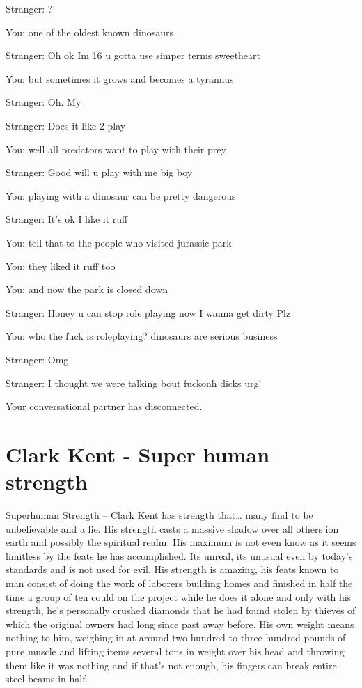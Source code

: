 \documentclass[a1paper]{article}
\begin{document}
\begin{multicols}{7}
{Stranger: ?'

You: one of the oldest known dinosaurs

Stranger: Oh ok Im 16 u gotta use simper terms sweetheart

You: but sometimes it grows and becomes a tyrannus

Stranger: Oh. My

Stranger: Does it like 2 play

You: well all predators want to play with their prey

Stranger: Good will u play with me big boy

You: playing with a dinosaur can be pretty dangerous

Stranger: It's ok I like it ruff

You: tell that to the people who visited jurassic park

You: they liked it ruff too

You: and now the park is closed down

Stranger: Honey u can stop role playing now I wanna get dirty Plz

You: who the fuck is roleplaying? dinosaurs are serious business

Stranger: Omg

Stranger: I thought we were talking bout fuckonh dicks urg!

Your conversational partner has disconnected.
\setlength{\parskip}{0.8em}












\section{Clark Kent - Super human strength}
Superhuman Strength – Clark Kent has strength that… many find to be unbelievable and a lie. His strength casts a massive shadow over all others ion earth and possibly the spiritual realm. His maximum is not even know as it seems limitless by the feats he has accomplished. Its unreal, its unusual even by today’s standards and is not used for evil. His strength is amazing, his feats known to man consist of doing the work of laborers building homes and finished in half the time a group of ten could on the project while he does it alone and only with his strength, he’s personally crushed diamonds that he had found stolen by thieves of which the original owners had long since past away before. His own weight means nothing to him, weighing in at around two hundred to three hundred pounds of pure muscle and lifting items several tons in weight over his head and throwing them like it was nothing and if that’s not enough, his fingers can break entire steel beams in half. 

}
\end{multicols}
\end{document}

